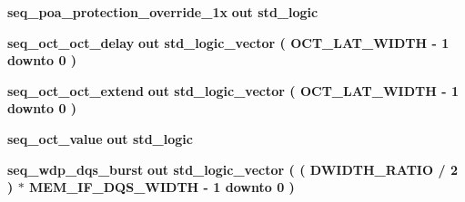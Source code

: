 \begin{DoxyCompactItemize}
{\bf seq\+\_\+poa\+\_\+protection\+\_\+override\+\_\+1x}  {\bfseries {\bfseries \textcolor{keywordflow}{out}\textcolor{vhdlchar}{ }}} {\bfseries \textcolor{comment}{std\+\_\+logic}\textcolor{vhdlchar}{ }} 
\item 
{\bf seq\+\_\+oct\+\_\+oct\+\_\+delay}  {\bfseries {\bfseries \textcolor{keywordflow}{out}\textcolor{vhdlchar}{ }}} {\bfseries \textcolor{comment}{std\+\_\+logic\+\_\+vector}\textcolor{vhdlchar}{ }\textcolor{vhdlchar}{(}\textcolor{vhdlchar}{ }\textcolor{vhdlchar}{ }\textcolor{vhdlchar}{ }\textcolor{vhdlchar}{ }{\bfseries {\bf O\+C\+T\+\_\+\+L\+A\+T\+\_\+\+W\+I\+D\+TH}} \textcolor{vhdlchar}{-\/}\textcolor{vhdlchar}{ } \textcolor{vhdldigit}{1} \textcolor{vhdlchar}{ }\textcolor{keywordflow}{downto}\textcolor{vhdlchar}{ }\textcolor{vhdlchar}{ } \textcolor{vhdldigit}{0} \textcolor{vhdlchar}{ }\textcolor{vhdlchar}{)}\textcolor{vhdlchar}{ }} 
\item 
{\bf seq\+\_\+oct\+\_\+oct\+\_\+extend}  {\bfseries {\bfseries \textcolor{keywordflow}{out}\textcolor{vhdlchar}{ }}} {\bfseries \textcolor{comment}{std\+\_\+logic\+\_\+vector}\textcolor{vhdlchar}{ }\textcolor{vhdlchar}{(}\textcolor{vhdlchar}{ }\textcolor{vhdlchar}{ }\textcolor{vhdlchar}{ }\textcolor{vhdlchar}{ }{\bfseries {\bf O\+C\+T\+\_\+\+L\+A\+T\+\_\+\+W\+I\+D\+TH}} \textcolor{vhdlchar}{-\/}\textcolor{vhdlchar}{ } \textcolor{vhdldigit}{1} \textcolor{vhdlchar}{ }\textcolor{keywordflow}{downto}\textcolor{vhdlchar}{ }\textcolor{vhdlchar}{ } \textcolor{vhdldigit}{0} \textcolor{vhdlchar}{ }\textcolor{vhdlchar}{)}\textcolor{vhdlchar}{ }} 
\item 
{\bf seq\+\_\+oct\+\_\+value}  {\bfseries {\bfseries \textcolor{keywordflow}{out}\textcolor{vhdlchar}{ }}} {\bfseries \textcolor{comment}{std\+\_\+logic}\textcolor{vhdlchar}{ }} 
\item 
{\bf seq\+\_\+wdp\+\_\+dqs\+\_\+burst}  {\bfseries {\bfseries \textcolor{keywordflow}{out}\textcolor{vhdlchar}{ }}} {\bfseries \textcolor{comment}{std\+\_\+logic\+\_\+vector}\textcolor{vhdlchar}{ }\textcolor{vhdlchar}{(}\textcolor{vhdlchar}{ }\textcolor{vhdlchar}{(}\textcolor{vhdlchar}{ }\textcolor{vhdlchar}{ }\textcolor{vhdlchar}{ }\textcolor{vhdlchar}{ }{\bfseries {\bf D\+W\+I\+D\+T\+H\+\_\+\+R\+A\+T\+IO}} \textcolor{vhdlchar}{/}\textcolor{vhdlchar}{ } \textcolor{vhdldigit}{2} \textcolor{vhdlchar}{ }\textcolor{vhdlchar}{)}\textcolor{vhdlchar}{ }\textcolor{vhdlchar}{$\ast$}\textcolor{vhdlchar}{ }\textcolor{vhdlchar}{ }\textcolor{vhdlchar}{ }{\bfseries {\bf M\+E\+M\+\_\+\+I\+F\+\_\+\+D\+Q\+S\+\_\+\+W\+I\+D\+TH}} \textcolor{vhdlchar}{-\/}\textcolor{vhdlchar}{ } \textcolor{vhdldigit}{1} \textcolor{vhdlchar}{ }\textcolor{keywordflow}{downto}\textcolor{vhdlchar}{ }\textcolor{vhdlchar}{ } \textcolor{vhdldigit}{0} \textcolor{vhdlchar}{ }\textcolor{vhdlchar}{)}\textcolor{vhdlchar}{ }} 

\end{DoxyCompactItemize}
